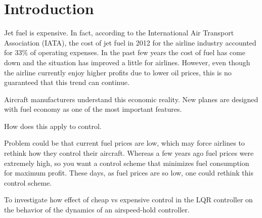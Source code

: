 \section{Introduction} \label{sec:intro}


Jet fuel is expensive. In fact, according to the International Air
Transport Association (IATA), the cost of jet fuel in 2012 for the
airline industry accounted for 33\% of operating expenses. In the past
few years the cost of fuel has come down and the situation has improved
a little for airlines. However, even though the airline currently
enjoy higher profits due to lower oil prices, this is no guaranteed
that this trend can continue. 

Aircraft manufacturers understand this economic reality. New planes
are designed with fuel economy as one of the most important features. 

How does this apply to control. 



Problem could be that current fuel prices are low, which may force
airlines to rethink how they control their aircraft. Whereas a few
years ago fuel prices were extremely high, so you want a control
scheme that minimizes fuel consumption for maximum profit. These
days, as fuel prices are so low, one could rethink this control
scheme.

To investigate how effect of cheap vs expensive control in the
LQR controller on the behavior of the dynamics of an airspeed-hold
controller.
  
